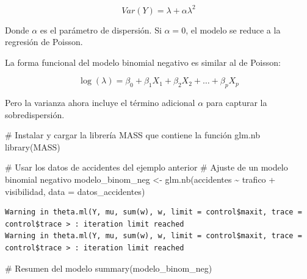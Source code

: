 \documentclass[
  letterpaper,
  DIV=11,
  numbers=noendperiod]{scrreprt}
\newenvironment{Shaded}{\begin{snugshade}}{\end{snugshade}}
\newcommand{\AttributeTok}[1]{\textcolor[rgb]{0.40,0.45,0.13}{#1}}
\newcommand{\CommentTok}[1]{\textcolor[rgb]{0.37,0.37,0.37}{#1}}
\newcommand{\FunctionTok}[1]{\textcolor[rgb]{0.28,0.35,0.67}{#1}}
\newcommand{\NormalTok}[1]{\textcolor[rgb]{0.00,0.23,0.31}{#1}}
\newcommand{\OtherTok}[1]{\textcolor[rgb]{0.00,0.23,0.31}{#1}}
\newcommand{\SpecialCharTok}[1]{\textcolor[rgb]{0.37,0.37,0.37}{#1}}
\begin{document}
\[
Var(Y) = \lambda + \alpha \lambda^2
\]

Donde \(\alpha\) es el parámetro de dispersión. Si \(\alpha = 0\), el
modelo se reduce a la regresión de Poisson.

La forma funcional del modelo binomial negativo es similar al de
Poisson:

\[
\log(\lambda) = \beta_0 + \beta_1 X_1 + \beta_2 X_2 + \dots + \beta_p X_p
\]

Pero la varianza ahora incluye el término adicional \(\alpha\) para
capturar la sobredispersión.

\begin{tcolorbox}[enhanced jigsaw, leftrule=.75mm, breakable, colbacktitle=quarto-callout-tip-color!10!white, bottomrule=.15mm, colframe=quarto-callout-tip-color-frame, toprule=.15mm, colback=white, coltitle=black, bottomtitle=1mm, left=2mm, title=\textcolor{quarto-callout-tip-color}{\faLightbulb}\hspace{0.5em}{Ejemplo}, opacityback=0, arc=.35mm, opacitybacktitle=0.6, toptitle=1mm, titlerule=0mm, rightrule=.15mm]

\begin{Shaded}
\begin{Highlighting}[]
\CommentTok{\# Instalar y cargar la librería MASS que contiene la función glm.nb}
\FunctionTok{library}\NormalTok{(MASS)}

\CommentTok{\# Usar los datos de accidentes del ejemplo anterior}
\CommentTok{\# Ajuste de un modelo binomial negativo}
\NormalTok{modelo\_binom\_neg }\OtherTok{\textless{}{-}} \FunctionTok{glm.nb}\NormalTok{(accidentes }\SpecialCharTok{\textasciitilde{}}\NormalTok{ trafico }\SpecialCharTok{+}\NormalTok{ visibilidad, }\AttributeTok{data =}\NormalTok{ datos\_accidentes)}
\end{Highlighting}
\end{Shaded}

\begin{verbatim}
Warning in theta.ml(Y, mu, sum(w), w, limit = control$maxit, trace =
control$trace > : iteration limit reached
Warning in theta.ml(Y, mu, sum(w), w, limit = control$maxit, trace =
control$trace > : iteration limit reached
\end{verbatim}

\begin{Shaded}
\begin{Highlighting}[]
\CommentTok{\# Resumen del modelo}
\FunctionTok{summary}\NormalTok{(modelo\_binom\_neg)}
\end{Highlighting}
\end{Shaded}


\end{tcolorbox}
\end{document}
